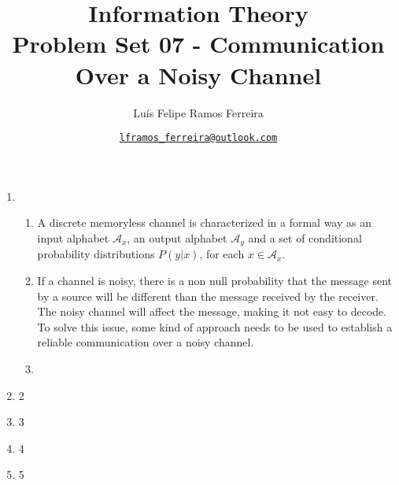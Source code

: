 \documentclass{article}
\title{Information Theory \\ \large Problem Set 07 - Communication Over a Noisy Channel}
\author{Luís Felipe Ramos Ferreira}
\date{\href{mailto:lframos\_ferreira@outlook.com}{\texttt{lframos\_ferreira@outlook.com}}
}
\begin{document}
\maketitle

\begin{enumerate}
    \item  \begin{enumerate}
            \item A discrete memoryless channel is characterized in a formal way as an input alphabet \(\mathcal{A}_x\), an output alphabet \(\mathcal{A}_y\) and a set of conditional probability distributions \(P(y | x)\), for each \(x \in \mathcal{A}_x\).
            \item If a channel is noisy, there is a non null probability that the message sent by a source will be different than the message received by the receiver. The noisy channel will affect the message, making it not easy to decode. To solve this issue, some kind of approach needs to be used to establish a reliable communication over a noisy channel.
            \item 
        \end{enumerate}
    \item 2
    \item 3
    \item 4
    \item 5

\end{enumerate}


\end{document}
